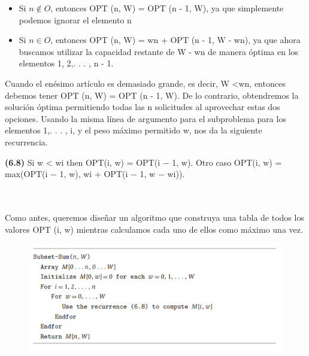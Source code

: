 \documentclass[a4paper, 12pt]{book}
\theoremstyle{dotless}
\begin{document}
\begin{itemize}
    \item Si $n \not  \in  O$, entonces OPT (n, W) = OPT (n - 1, W), ya que simplemente podemos ignorar el elemento n
    \item Si $n  \in  O$, entonces OPT (n, W) = wn + OPT (n - 1, W - wn), ya que ahora buscamos utilizar la capacidad restante de W - wn de manera óptima en los elementos 1, 2,. . . , n - 1.
\end{itemize}

Cuando el enésimo artículo es demasiado grande, es decir, W <wn, entonces debemos tener OPT (n, W) = OPT (n - 1, W). De lo contrario, obtendremos la solución óptima permitiendo todas las n solicitudes al aprovechar estas dos opciones. Usando la misma línea de argumento para el subproblema para los elementos {1,. . . , i}, y el peso máximo permitido w, nos da la siguiente recurrencia.\\

\colorbox{mygray}{\parbox{15cm}{
\textbf{(6.8)} Si w < wi then OPT(i, w) = OPT(i − 1, w). Otro caso
OPT(i, w) = max(OPT(i − 1, w), wi + OPT(i − 1, w − wi)).}}\\\\

Como antes, queremos diseñar un algoritmo que construya una tabla de todos los valores OPT (i, w) mientras calculamos cada uno de ellos como máximo una vez.

\begin{figure}[h]
\centering
\includegraphics[scale=1]{Imagenes-Seccion6/cod6_7.PNG}
\end{figure}
\end{document}
